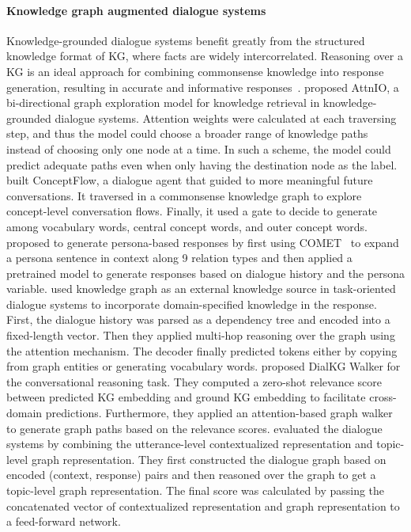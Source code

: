 \paragraph*{Knowledge graph augmented dialogue systems} Knowledge-grounded dialogue systems benefit greatly from the structured knowledge format of KG, where facts are widely intercorrelated. Reasoning over a KG is an ideal approach for combining commonsense knowledge into response generation, resulting in accurate and informative responses~.  proposed AttnIO, a bi-directional graph exploration model for knowledge retrieval in knowledge-grounded dialogue systems. Attention weights were calculated at each traversing step, and thus the model could choose a broader range of knowledge paths instead of choosing only one node at a time. In such a scheme, the model could predict adequate paths even when only having the destination node as the label.  built ConceptFlow, a dialogue agent that guided to more meaningful future conversations. It traversed in a commonsense knowledge graph to explore concept-level conversation flows. Finally, it used a gate to decide to generate among vocabulary words, central concept words, and outer concept words.  proposed to generate persona-based responses by first using COMET~ to expand a persona sentence in context along 9 relation types and then applied a pretrained model to generate responses based on dialogue history and the persona variable.  used knowledge graph as an external knowledge source in task-oriented dialogue systems to incorporate domain-specified knowledge in the response. First, the dialogue history was parsed as a dependency tree and encoded into a fixed-length vector. Then they applied multi-hop reasoning over the graph using the attention mechanism. The decoder finally predicted tokens either by copying from graph entities or generating vocabulary words.  proposed DialKG Walker for the conversational reasoning task. They computed a zero-shot relevance score between predicted KG embedding and ground KG embedding to facilitate cross-domain predictions. Furthermore, they applied an attention-based graph walker to generate graph paths based on the relevance scores.  evaluated the dialogue systems by combining the utterance-level contextualized representation and topic-level graph representation. They first constructed the dialogue graph based on encoded (context, response) pairs and then reasoned over the graph to get a topic-level graph representation. The final score was calculated by passing the concatenated vector of contextualized representation and graph representation to a feed-forward network.


